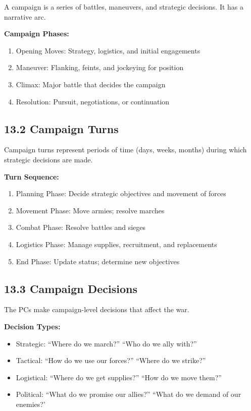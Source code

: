 \documentclass[11pt]{article}
\begin{document}
A campaign is a series of battles, maneuvers, and strategic decisions. It has a narrative arc.

\textbf{Campaign Phases:}
\begin{enumerate}
  \item Opening Moves: Strategy, logistics, and initial engagements
  \item Maneuver: Flanking, feints, and jockeying for position
  \item Climax: Major battle that decides the campaign
  \item Resolution: Pursuit, negotiations, or continuation
\end{enumerate}

\subsection{13.2 Campaign Turns}

Campaign turns represent periods of time (days, weeks, months) during which strategic decisions are made.

\textbf{Turn Sequence:}
\begin{enumerate}
  \item Planning Phase: Decide strategic objectives and movement of forces
  \item Movement Phase: Move armies; resolve marches
  \item Combat Phase: Resolve battles and sieges
  \item Logistics Phase: Manage supplies, recruitment, and replacements
  \item End Phase: Update status; determine new objectives
\end{enumerate}

\subsection{13.3 Campaign Decisions}

The PCs make campaign-level decisions that affect the war.

\textbf{Decision Types:}
\begin{itemize}
  \item Strategic: ``Where do we march?'' ``Who do we ally with?''
  \item Tactical: ``How do we use our forces?'' ``Where do we strike?''
  \item Logistical: ``Where do we get supplies?'' ``How do we move them?''
  \item Political: ``What do we promise our allies?'' ``What do we demand of our enemies?'
\end{itemize}
\end{document}
